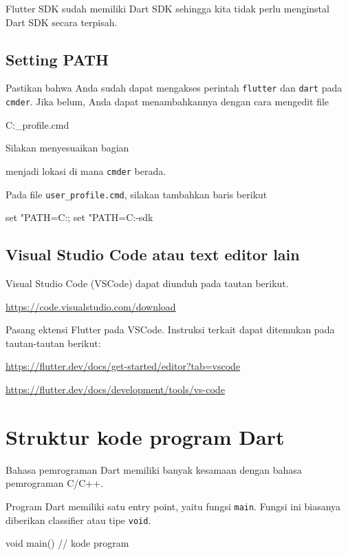 \documentclass[a4paper,11pt]{article} %
\newcommand{\txtinline}[1]{\texttt{#1}}
\newcommand{\dartinline}[1]{\texttt{#1}}
\begin{document}
Flutter SDK sudah memiliki Dart SDK sehingga kita tidak perlu menginstal
Dart SDK secara terpisah.

\subsection{Setting PATH}

Pastikan bahwa Anda sudah dapat mengakses perintah \txtinline{flutter}
dan \txtinline{dart} pada \txtinline{cmder}. Jika belum, Anda dapat menambahkannya
dengan cara mengedit file
\begin{textcode}
C:\Users\jendela\cmder\config\user_profile.cmd
\end{textcode}
Silakan menyesuaikan bagian
\begin{textcode}
\end{textcode}
menjadi lokasi di mana \txtinline{cmder} berada.

Pada file \txtinline{user_profile.cmd}, silakan tambahkan baris berikut
\begin{textcode}
set "PATH=C:\Users\jendela\flutter\bin;%
set "PATH=C:\Users\jendela\flutter\bin\cache\dart-sdk\bin
\end{textcode}


\subsection{Visual Studio Code atau text editor lain}

Visual Studio Code (VSCode) dapat diunduh pada tautan berikut.

{\footnotesize
\url{https://code.visualstudio.com/download}
}

Pasang ektensi Flutter pada VSCode. Instruksi terkait dapat ditemukan pada
tautan-tautan berikut:

{\footnotesize
\url{https://flutter.dev/docs/get-started/editor?tab=vscode}
}

{\footnotesize
\url{https://flutter.dev/docs/development/tools/vs-code}
}


\section{Struktur kode program Dart}

Bahasa pemrograman Dart memiliki banyak kesamaan dengan bahasa
pemrograman C/C++.

Program Dart memiliki satu entry point, yaitu fungsi \dartinline{main}.
Fungsi ini biasanya diberikan classifier atau tipe \dartinline{void}.
\begin{dartcode}
void main() {
  // kode program
}
\end{dartcode}
\end{document}
